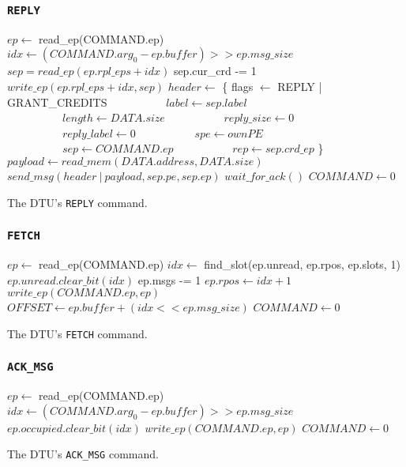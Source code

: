 \documentclass[a4paper,11pt,draft]{article}
\begin{document}
\subsubsection{\texttt{REPLY}}

\begin{algorithm}[H]
    $ep \gets$ read\_ep(COMMAND.ep)\;
    \BlankLine
    $idx \gets (COMMAND.arg_0 - ep.buffer) >> ep.msg\_size$\;
    $sep = read\_ep(ep.rpl\_eps + idx)$\;
    \BlankLine
    sep.cur\_crd -= 1\;
    $write\_ep(ep.rpl\_eps + idx, sep)$\;
    \BlankLine
    $header \gets$ \{ flags $\gets$ REPLY | GRANT\_CREDITS\;
    $\quad\quad\quad\quad\quad label \gets sep.label$\;
    $\quad\quad\quad\quad\quad length \gets DATA.size$\;
    $\quad\quad\quad\quad\quad reply\_size \gets 0$\;
    $\quad\quad\quad\quad\quad reply\_label \gets 0$\;
    $\quad\quad\quad\quad\quad spe \gets ownPE$\;
    $\quad\quad\quad\quad\quad sep \gets COMMAND.ep$\;
    $\quad\quad\quad\quad\quad rep \gets sep.crd\_ep$ \}\;
    $payload \gets read\_mem(DATA.address, DATA.size)$\;
    $send\_msg(header\ |\ payload, sep.pe, sep.ep)$\;
    $wait\_for\_ack()$\;
    \BlankLine
    $COMMAND \gets 0$\;
    \caption{The DTU's \texttt{REPLY} command.}
\end{algorithm}

\subsubsection{\texttt{FETCH}}

\begin{algorithm}[H]
    $ep \gets$ read\_ep(COMMAND.ep)\;
    \BlankLine
    $idx \gets$ find\_slot(ep.unread, ep.rpos, ep.slots, 1)\;
    $ep.unread.clear\_bit(idx)$\;
    ep.msgs -= 1\;
    $ep.rpos \gets idx + 1$\;
    $write\_ep(COMMAND.ep, ep)$\;
    \BlankLine
    $OFFSET \gets ep.buffer + (idx << ep.msg\_size)$\;
    $COMMAND \gets 0$\;
    \caption{The DTU's \texttt{FETCH} command.}
\end{algorithm}

\subsubsection{\texttt{ACK\_MSG}}

\begin{algorithm}[H]
    $ep \gets$ read\_ep(COMMAND.ep)\;
    \BlankLine
    $idx \gets (COMMAND.arg_0 - ep.buffer) >> ep.msg\_size$\;
    $ep.occupied.clear\_bit(idx)$\;
    $write\_ep(COMMAND.ep, ep)$\;
    \BlankLine
    \BlankLine
    $COMMAND \gets 0$\;
    \caption{The DTU's \texttt{ACK\_MSG} command.}
\end{algorithm}
\end{document}

